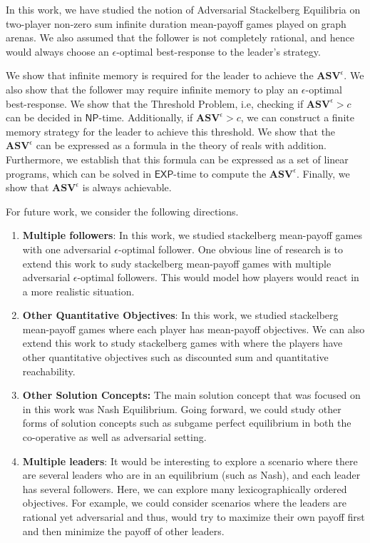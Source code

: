 In this work, we have studied the notion of Adversarial Stackelberg Equilibria on two-player non-zero sum infinite duration mean-payoff games played on graph arenas. We also assumed that the follower is not completely rational, and hence would always choose an $\epsilon$-optimal best-response to the leader's strategy.

We show that infinite memory is required for the leader to achieve the $\mathbf{ASV}^{\epsilon}$. We also show that the follower may require infinite memory to play an $\epsilon$-optimal best-response. We show that the Threshold Problem, i.e, checking if $\mathbf{ASV}^{\epsilon} > c$ can be decided in $\mathsf{NP}$-time. Additionally, if $\mathbf{ASV}^{\epsilon} > c$, we can construct a finite memory strategy for the leader to achieve this threshold. We show that the $\mathbf{ASV}^{\epsilon}$ can be expressed as a formula in the theory of reals with addition. Furthermore, we establish that this formula can be expressed as a set of linear programs, which can be solved in $\mathsf{EXP}$-time to compute the $\mathbf{ASV}^{\epsilon}$. Finally, we show that $\mathbf{ASV}^{\epsilon}$ is always achievable.

For future work, we consider the following directions.
\begin{enumerate}
    \item \textbf{Multiple followers}: In this work, we studied stackelberg mean-payoff games with one adversarial $\epsilon$-optimal follower. One obvious line of research is to extend this work to sudy stackelberg mean-payoff games with multiple adversarial $\epsilon$-optimal followers. This would model how players would react in a more realistic situation.
    \item \textbf{Other Quantitative Objectives}: In this work, we studied stackelberg mean-payoff games where  each player has mean-payoff objectives. We can also extend this work to study stackelberg games with where the players have other quantitative objectives such as discounted sum and quantitative reachability.
    \item \textbf{Other Solution Concepts:} The main solution concept that was focused on in this work was Nash Equilibrium. Going forward, we could study other forms of solution concepts such as subgame perfect equilibrium in both the co-operative as well as adversarial setting.
    \item \textbf{Multiple leaders}: It would be interesting to explore a scenario where there are several leaders who are in an equilibrium (such as Nash), and each leader has several followers. Here, we can explore many lexicographically ordered objectives. For example, we could consider scenarios where the leaders are rational yet adversarial and thus, would try to maximize their own payoff first and then minimize the payoff of other leaders. 
\end{enumerate}